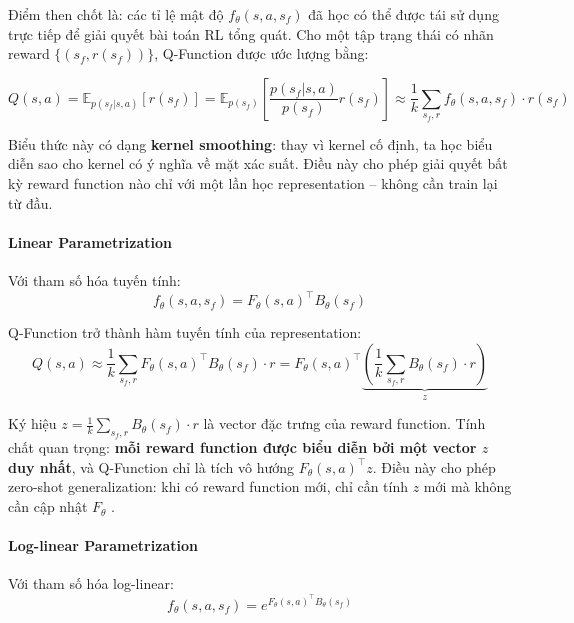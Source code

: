 Điểm then chốt là: các tỉ lệ mật độ $f_\theta(s, a, s_f)$ đã học có
thể được tái sử dụng trực tiếp để giải quyết bài toán RL tổng quát.
Cho một tập trạng thái có nhãn reward $\{(s_f, r(s_f))\}$, Q-Function
được ước lượng bằng:

\begin{equation}
    Q(s, a) = \mathbb{E}_{p(s_f|s,a)}[r(s_f)]
    = \mathbb{E}_{p(s_f)} \left[ \frac{p(s_f|s,a)}{p(s_f)} r(s_f)
    \right]
    \approx \frac{1}{k} \sum_{s_f, r} f_\theta(s, a, s_f) \cdot r(s_f)
    \label{eq:q_general}
\end{equation}

Biểu thức này có dạng \textbf{kernel smoothing}: thay vì kernel cố
định, ta học biểu diễn sao cho kernel có ý nghĩa về mặt xác suất.
Điều này cho phép giải quyết bất kỳ reward function nào chỉ với một
lần học representation -- không cần train lại từ đầu.

\paragraph{Linear Parametrization}

Với tham số hóa tuyến tính:
\begin{equation}
    f_\theta(s, a, s_f) = F_\theta(s, a)^\top B_\theta(s_f)
    \label{eq:linear_param}
\end{equation}

Q-Function trở thành hàm tuyến tính của representation:
\begin{equation}
    Q(s, a) \approx \frac{1}{k} \sum_{s_f, r} F_\theta(s,a)^\top
    B_\theta(s_f) \cdot r = F_\theta(s,a)^\top \underbrace{\left(
    \frac{1}{k} \sum_{s_f, r} B_\theta(s_f) \cdot r \right)}_{z}
    \label{eq:linear_q}
\end{equation}

Ký hiệu $z = \frac{1}{k} \sum_{s_f,r} B_\theta(s_f) \cdot r$ là
vector đặc trưng của reward function. Tính chất quan trọng:
\textbf{mỗi reward function được biểu diễn bởi một vector $z$ duy
nhất}, và Q-Function chỉ là tích vô hướng $F_\theta(s,a)^\top z$.
Điều này cho phép zero-shot generalization: khi có reward function
mới, chỉ cần tính $z$ mới mà không cần cập nhật $F_\theta$
\cite{eysenbach2025generativerl}.

\paragraph{Log-linear Parametrization}

Với tham số hóa log-linear:
\begin{equation}
    f_\theta(s, a, s_f) = e^{F_\theta(s,a)^\top B_\theta(s_f)}
    \label{eq:loglinear_param}
\end{equation}

